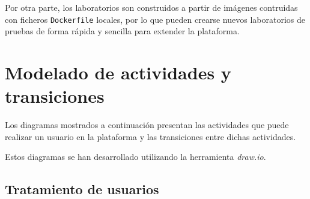             Por otra parte, los laboratorios son construidos a partir de imágenes contruidas con ficheros \texttt{Dockerfile} locales, por lo que pueden crearse nuevos laboratorios de pruebas de forma rápida y sencilla para extender la plataforma.
            
            \newpage
    
    
    \section{Modelado de actividades y transiciones}
        \label{sec:modelado-actividades-transiciones}

        Los diagramas mostrados a continuación presentan las actividades que puede realizar un usuario en la plataforma y las transiciones entre dichas actividades.
        
        Estos diagramas se han desarrollado utilizando la herramienta \textit{draw.io}.
        
        \subsection{Tratamiento de usuarios}
        
